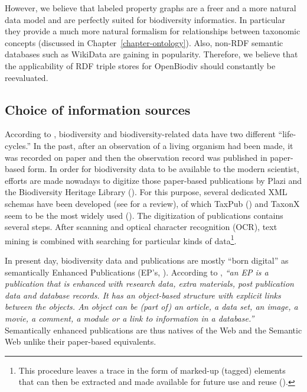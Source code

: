 However, we believe that labeled property graphs are a freer and a more natural data model and are perfectly suited for biodiversity informatics. In particular they provide a much more natural formalism for relationships between taxonomic concepts (discussed in Chapter~\ref{chapter-ontology}). Also, non-RDF semantic databases such as \mbox{WikiData} are gaining in popularity. Therefore, we believe that the applicability of RDF triple stores for OpenBiodiv should constantly be reevaluated.

\subsection*{Choice of information sources}

According to \cite{noauthor_pro-ibiosphere_2014}, biodiversity and biodiversity-related data have two different ``life-cycles.'' In the past, after an observation of a living organism had been made, it was recorded on paper and then the observation record was published in paper-based form. In order for biodiversity data to be available to the modern scientist, efforts are made nowadays to digitize those paper-based publications by Plazi \cite{agosti_why_2007} and the Biodiversity Heritage Library (\cite{miller_taxonomic_2012}). For this purpose, several dedicated XML schemas have been developed (see \cite{penev_xml_2011} for a review), of which TaxPub (\cite{catapano_taxpub:_2010}) and TaxonX  seem to be the most widely used (\cite{penev_implementation_2012}). The digitization of publications contains several steps. After scanning and optical character recognition (OCR), text mining is combined with searching for particular kinds of data\footnote{This procedure leaves a trace in the form of marked-up (tagged) elements that can then be extracted and made available for future use and reuse (\cite{miller_integrating_2015}).}.

In present day, biodiversity data and publications are mostly ``born digital'' as semantically Enhanced Publications (EP's, \cite{claerbout_electronic_1992,godtsenhoven_van_emerging_2009,shotton_semantic_2009}). According to \cite{claerbout_electronic_1992}, \emph{``an EP is a publication that is enhanced with research data, extra materials, post publication data and database records. It has an object-based structure with explicit links between the objects. An object can be (part of) an article, a data set, an image, a movie, a comment, a module or a link to information in a database.''} Semantically enhanced publications are thus natives of the Web and the Semantic Web unlike their paper-based equivalents.

